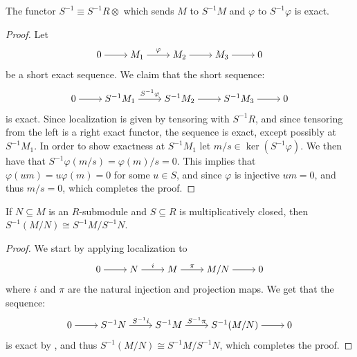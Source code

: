 \documentclass[11pt,a4paper]{article}
\begin{document}
\begin{proposition}
  \label{prop:exact-module-functor}
  The functor $S^{-1} \equiv S^{-1}R \otimes$
  which sends $M$ to $S^{-1}M$ and $\varphi$ to $S^{-1} \varphi$ is exact.
\end{proposition}
\begin{proof}
  Let
    \[\begin{tikzcd}[ampersand replacement=\&,cramped]
    0 \& {M_1} \& {M_2} \& {M_3} \& 0
    \arrow[from=1-1, to=1-2]
    \arrow["\varphi",from=1-2, to=1-3]
    \arrow[from=1-3, to=1-4]
    \arrow[from=1-4, to=1-5]
  \end{tikzcd}\]
  be a short exact sequence.
  We claim that the short sequence:
  \[\begin{tikzcd}[ampersand replacement=\&,cramped]
    0 \& {S^{-1}M_1} \& {S^{-1}M_2} \& {S^{-1}M_3} \& 0
    \arrow[from=1-1, to=1-2]
    \arrow["S^{-1}\varphi",from=1-2, to=1-3]
    \arrow[from=1-3, to=1-4]
    \arrow[from=1-4, to=1-5]
  \end{tikzcd}\]
  is exact.
  Since localization is given by tensoring with $S^{-1}R$,
  and since tensoring from the left is a right exact functor,
  the sequence is exact, except possibly at $S^{-1}M_1$.
  In order to show exactness at $S^{-1}M_1$
  let $m/s \in \ker(S^{-1}\varphi)$.
  We then have that $S^{-1}\varphi(m/s) = \varphi(m)/s = 0$.
  This implies that $\varphi(um) = u \varphi(m) = 0$
  for some $u \in S$, and since $\varphi$ is injective $um = 0$,
  and thus $m/s = 0$, which completes the proof.
\end{proof}

\begin{corollary}
  If $N \subseteq M$ is an $R$-submodule and $S \subseteq R$ is
  multiplicatively closed, then $S^{-1}(M/N) \cong S^{-1}M/S^{-1}N$.
\end{corollary}
\begin{proof}
  We start by applying localization to
  \[\begin{tikzcd}[ampersand replacement=\&,cramped]
    0 \& N \& M \& M/N \& 0
    \arrow[from=1-1, to=1-2]
    \arrow["i", from=1-2, to=1-3]
    \arrow["\pi", from=1-3, to=1-4]
    \arrow[from=1-4, to=1-5]
  \end{tikzcd}\]
  where $i$ and $\pi$ are the natural injection and projection maps.
  We get that the sequence:
  \[\begin{tikzcd}[ampersand replacement=\&,cramped]
    0 \& S^{-1}N \& S^{-1}M \& S^{-1}(M/N) \& 0
    \arrow[from=1-1, to=1-2]
    \arrow["S^{-1}i", from=1-2, to=1-3]
    \arrow["S^{-1}\pi", from=1-3, to=1-4]
    \arrow[from=1-4, to=1-5]
  \end{tikzcd}\]
  is exact by ,
  and thus $S^{-1}(M/N) \cong S^{-1}M/S^{-1}N$,
  which completes the proof.
\end{proof}
\end{document}
